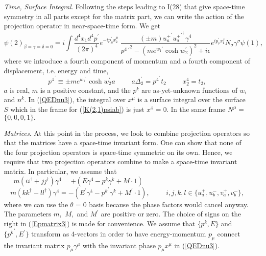 \documentclass[a4paper,12pt]{article}
\begin{document}
	{\textit{Time, Surface Integral}}. Following the steps leading to I(28) that give space-time symmetry in all parts except for the matrix part, we can write the action of the projection operator in near-space-time form. We get
\begin{equation}	\label{QEDnu3}
\psi(2)_{\beta = \gamma = \delta = 0} = i\int \frac{d^4 x_{1} d^4 p^{\prime} }{(2 \pi)^4} e^{-ip_{\mu}^{\prime}x_{2}^{\mu}} \; \frac{ (\pm m) {u_{a}^{+}}^{\prime} {{u_{a}^{+}}^{\prime}}^{\dagger}  \gamma^{4}}{{p^{4 \; \prime}}^2-{(m e^{{w_{1}}^{\prime}} \cosh w_{2}^{\prime})}^2  + i\epsilon} e^{ip_{\nu}^{\prime}x_{1}^{\nu}}  N_{\sigma} \gamma^{\sigma} \psi(1),
\end{equation}
where we introduce a fourth component of momentum and a fourth component of displacement, i.e. energy and time,
\begin{equation}	\label{p4t}
{p^{4}}^{\prime} \equiv \pm m e^{{w_{1}}^{\prime}} \cosh w_{2}^{\prime} a   \hspace{1cm}  a \Delta_{2}^{\prime} = {p^{4}}^{\prime} t_{2} \hspace{1cm} x_{2}^{4} = t_{2}, 
\end{equation}
$a$ is real, $m$ is a positive constant, and the $p^{k}$ are as-yet-unknown functions of $w_{i}$ and $n^{k}.$ In (\ref{QEDnu3}), the integral over $x^{\mu}$ is a surface integral over the surface $S$ which in the frame for (\ref{K(2,1)psiab}) is just $x^{4}$ = 0. In the same frame $N^{\mu}$ = $\{0,0,0,1\}.$

	{\textit{Matrices}}. At this point in the process, we look to combine projection operators so that the matrices have a space-time invariant form. One can show that none of the four projection operators is space-time symmetric on its own. Hence, we require that two projection operators combine to make a space-time invariant matrix. In particular, we assume that
$$m(i i^{\dagger} + j j^{\dagger}) \gamma^{4} = + (E \gamma^{4} - p^{k} \gamma^{k} + M \cdot 1) \hspace{6cm}  $$
\begin{equation} \label{Epmatrix3}
 m(k k^{\dagger} + l l^{\dagger}) \gamma^{4} = - (E^{\prime} \gamma^{4} - {p^{k}}^{\prime} \gamma^{k} + M^{\prime} \cdot 1),    \hspace{1cm} i,j,k,l \in \{ u_{a}^{+},  u_{b}^{-},  v_{a}^{+},  v_{b}^{-} \},
\end{equation}
where we can use the $\theta$ = 0 basis because the phase factors would cancel anyway. The parameters $m,$ $M,$ and $M^{\prime}$ are positive or zero. The choice of signs on the right in (\ref{Epmatrix3}) is made for convenience. We assume that $\{p^{k},E\}$ and $\{{p^{k}}^{\prime},E^{\prime}\}$ transform as 4-vectors in order to have energy-momentum $p_{\mu}$ connect the invariant matrix $p_{\mu} \gamma^{\mu}$ with the invariant phase $p_{\mu} x^{\mu}$ in (\ref{QEDnu3}). 
\end{document}
